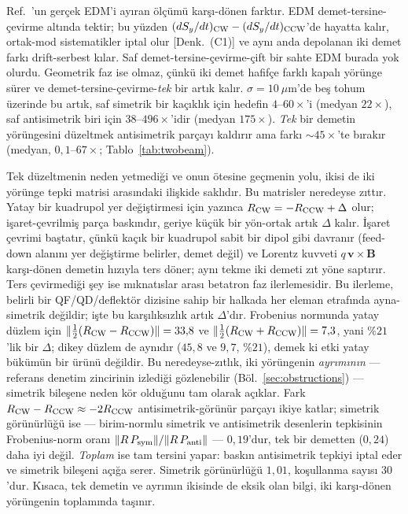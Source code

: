 \documentclass[aps,prab,reprint,superscriptaddress,nofootinbib]{revtex4-2}
\begin{document}
Ref.~\cite{omarov}'un gerçek EDM'i ayıran ölçümü karşı-dönen farktır. EDM
demet-tersine-çevirme altında tektir; bu yüzden
$(dS_y/dt)_{\rm CW}-(dS_y/dt)_{\rm CCW}$'de hayatta kalır, ortak-mod sistematikler
iptal olur [Denk.~(C1)] ve aynı anda depolanan iki demet farkı drift-serbest kılar.
Saf demet-tersine-çevirme-çift bir sahte EDM burada yok olurdu. Geometrik faz ise
olmaz, çünkü iki demet hafifçe farklı kapalı yörünge sürer ve
demet-tersine-çevirme-\emph{tek} bir artık kalır. $\sigma=10~\mu$m'de beş tohum
üzerinde bu artık, saf simetrik bir kaçıklık için hedefin $4$--$60\times$'i (medyan
$22\times$), saf antisimetrik biri için $38$--$496\times$'idir (medyan $175\times$).
\emph{Tek} bir demetin yörüngesini düzeltmek antisimetrik parçayı kaldırır ama farkı
$\sim\!45\times$'te bırakır (medyan, $0{,}1$--$67\times$; Tablo~\ref{tab:twobeam}).

Tek düzeltmenin neden yetmediği ve onun ötesine geçmenin yolu, ikisi de iki yörünge
tepki matrisi arasındaki ilişkide saklıdır. Bu matrisler neredeyse zıttır. Yatay bir
kuadrupol yer değiştirmesi için yazınca $R_{\rm CW}=-R_{\rm CCW}+\Delta$ olur;
işaret-çevrilmiş parça baskındır, geriye küçük bir yön-ortak artık $\Delta$ kalır.
İşaret çevrimi baştatır, çünkü kaçık bir kuadrupol sabit bir dipol gibi davranır
(feed-down alanını yer değiştirme belirler, demet değil) ve Lorentz kuvveti
$q\,\bm v\times\bm B$ karşı-dönen demetin hızıyla ters döner; aynı tekme iki demeti
zıt yöne saptırır. Ters çevirmediği şey ise mıknatıslar arası betatron faz
ilerlemesidir. Bu ilerleme, belirli bir QF/QD/deflektör dizisine sahip bir halkada
her eleman etrafında ayna-simetrik değildir; işte bu karşılıksızlık artık
$\Delta$'dır. Frobenius normunda yatay düzlem için
$\lVert\tfrac12(R_{\rm CW}-R_{\rm CCW})\rVert=33{,}8$ ve
$\lVert\tfrac12(R_{\rm CW}+R_{\rm CCW})\rVert=7{,}3$, yani $\%21$'lik bir $\Delta$;
dikey düzlem de aynıdır ($45{,}8$ ve $9{,}7$, $\%21$), demek ki etki yatay bükümün
bir ürünü değildir. Bu neredeyse-zıtlık, iki yörüngenin \emph{ayrımının} ---
referans denetim zincirinin izlediği gözlenebilir (Böl.~\ref{sec:obstructions}) ---
simetrik bileşene neden kör olduğunu tam olarak açıklar. Fark
$R_{\rm CW}-R_{\rm CCW}\approx-2R_{\rm CCW}$ antisimetrik-görünür parçayı ikiye katlar;
simetrik görünürlüğü ise --- birim-normlu simetrik ve antisimetrik desenlerin
tepkisinin Frobenius-norm oranı $\lVert R\,P_{\rm sym}\rVert/\lVert R\,P_{\rm anti}\rVert$
--- $0{,}19$'dur, tek bir demetten ($0{,}24$) daha iyi değil. \emph{Toplam} ise tam
tersini yapar: baskın antisimetrik tepkiyi iptal eder ve simetrik bileşeni açığa
serer. Simetrik görünürlüğü $1{,}01$, koşullanma sayısı $30$'dur. Kısaca, tek demetin
ve ayrımın ikisinde de eksik olan bilgi, iki karşı-dönen yörüngenin toplamında
taşınır.
\end{document}

